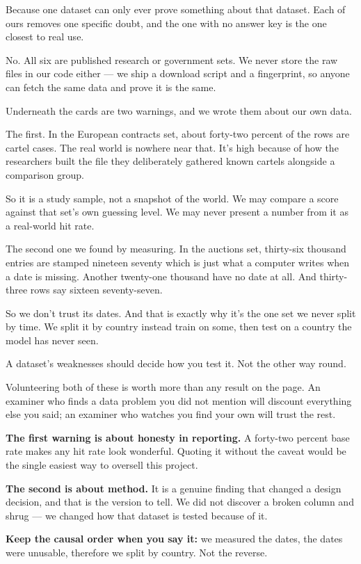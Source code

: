 \documentclass[11pt]{article}
\begin{document}
\begin{asked}
 Because one dataset can only ever prove
something about that dataset. Each of ours removes one specific doubt, and the
one with no answer key is the one closest to real use.

 No. All six are published research or
government sets. We never store the raw files in our code either --- we ship a
download script and a fingerprint, so anyone can fetch the same data and prove
it is the same.
\end{asked}


\begin{saythis}
Underneath the cards are two warnings, and we wrote them about our own data.

The first. In the European contracts set, about forty-two percent of the rows
are cartel cases. The real world is nowhere near that. It's high because of how
the researchers built the file \bt they deliberately gathered known cartels
alongside a comparison group.

So it is a study sample, not a snapshot of the world. We may compare a score
against that set's own guessing level. We may never present a number from it as
a real-world hit rate.

The second one we found by measuring. In the auctions set, thirty-six thousand
entries are stamped nineteen seventy \bt which is just what a computer writes
when a date is missing. Another twenty-one thousand have no date at all. And
thirty-three rows say sixteen seventy-seven.

So we don't trust its dates. And that is exactly why it's the one set we never
split by time. We split it by country instead \bt train on some, then test on a
country the model has never seen.

A dataset's weaknesses should decide how you test it. Not the other way round.
\end{saythis}

\begin{means}
Volunteering both of these is worth more than any result on the page. An
examiner who finds a data problem you did not mention will discount everything
else you said; an examiner who watches you find your own will trust the rest.

\textbf{The first warning is about honesty in reporting.} A forty-two percent
base rate makes any hit rate look wonderful. Quoting it without the caveat would
be the single easiest way to oversell this project.

\textbf{The second is about method.} It is a genuine finding that changed a
design decision, and that is the version to tell. We did not discover a broken
column and shrug --- we changed how that dataset is tested because of it.

\textbf{Keep the causal order when you say it:} we measured the dates, the dates
were unusable, therefore we split by country. Not the reverse.
\end{means}
\end{document}
